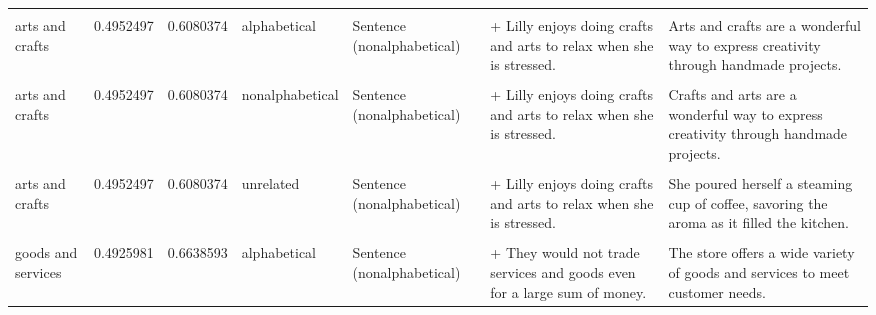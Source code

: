 \documentclass[
  12pt,
]{scrartcl}
\begin{document}
\begin{landscape}
\begin{longtable}{lrrllll}
\cellcolor{gray!6}{arts and crafts} & \cellcolor{gray!6}{0.4952497} & \cellcolor{gray!6}{0.6080374} & \cellcolor{gray!6}{alphabetical} & \cellcolor{gray!6}{Sentence (alphabetical)} & \cellcolor{gray!6}{+ Lilly enjoys doing arts and crafts to relax when she is stressed.} & \cellcolor{gray!6}{Arts and crafts are a wonderful way to express creativity through handmade projects.}\\
arts and crafts & 0.4952497 & 0.6080374 & alphabetical & Sentence (nonalphabetical) & + Lilly enjoys doing crafts and arts to relax when she is stressed. & Arts and crafts are a wonderful way to express creativity through handmade projects.\\
\cellcolor{gray!6}{arts and crafts} & \cellcolor{gray!6}{0.4952497} & \cellcolor{gray!6}{0.6080374} & \cellcolor{gray!6}{nonalphabetical} & \cellcolor{gray!6}{Sentence (alphabetical)} & \cellcolor{gray!6}{+ Lilly enjoys doing arts and crafts to relax when she is stressed.} & \cellcolor{gray!6}{Crafts and arts are a wonderful way to express creativity through handmade projects.}\\
\addlinespace
arts and crafts & 0.4952497 & 0.6080374 & nonalphabetical & Sentence (nonalphabetical) & + Lilly enjoys doing crafts and arts to relax when she is stressed. & Crafts and arts are a wonderful way to express creativity through handmade projects.\\
\cellcolor{gray!6}{arts and crafts} & \cellcolor{gray!6}{0.4952497} & \cellcolor{gray!6}{0.6080374} & \cellcolor{gray!6}{unrelated} & \cellcolor{gray!6}{Sentence (alphabetical)} & \cellcolor{gray!6}{+ Lilly enjoys doing arts and crafts to relax when she is stressed.} & \cellcolor{gray!6}{She poured herself a steaming cup of coffee, savoring the aroma as it filled the kitchen.}\\
arts and crafts & 0.4952497 & 0.6080374 & unrelated & Sentence (nonalphabetical) & + Lilly enjoys doing crafts and arts to relax when she is stressed. & She poured herself a steaming cup of coffee, savoring the aroma as it filled the kitchen.\\
\cellcolor{gray!6}{goods and services} & \cellcolor{gray!6}{0.4925981} & \cellcolor{gray!6}{0.6638593} & \cellcolor{gray!6}{alphabetical} & \cellcolor{gray!6}{Sentence (alphabetical)} & \cellcolor{gray!6}{+ They would not trade goods and services even for a large sum of money.} & \cellcolor{gray!6}{The store offers a wide variety of goods and services to meet customer needs.}\\
goods and services & 0.4925981 & 0.6638593 & alphabetical & Sentence (nonalphabetical) & + They would not trade services and goods even for a large sum of money. & The store offers a wide variety of goods and services to meet customer needs.\\

\end{longtable}
\end{landscape}
\end{document}
